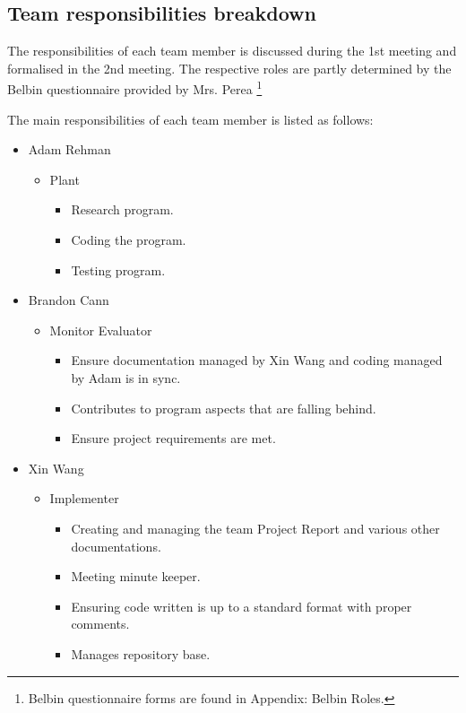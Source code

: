 \documentclass[12pt,a4paper]{article}
\begin{document}
	\subsection{Team responsibilities breakdown}
	The responsibilities of each team member is discussed during the 1st meeting and formalised in the 2nd meeting. The
	respective roles are partly determined by the Belbin questionnaire provided by Mrs. Perea 
	\footnote{Belbin questionnaire forms are found in Appendix: Belbin Roles.}
	\par
	The main responsibilities of each team member is listed as follows:
	\begin{itemize}
		\item Adam Rehman
		\begin{itemize}
			\item Plant
			\begin{itemize}
				\item Research program.
				\item Coding the program.
				\item Testing program.
			\end{itemize}
		\end{itemize}
		\item Brandon Cann
		\begin{itemize}
			\item Monitor Evaluator
			\begin{itemize}
				\item Ensure documentation managed by Xin Wang and coding managed by Adam is in sync.
				\item Contributes to program aspects that are falling behind.
				\item Ensure project requirements are met.
			\end{itemize}
		\end{itemize}
		\item Xin Wang
		\begin{itemize}
			\item Implementer
			\begin{itemize}
				\item Creating and managing the team Project Report and various other documentations.
				\item Meeting minute keeper.
				\item Ensuring code written is up to a standard format with proper comments.
				\item Manages repository base.
			\end{itemize}
		\end{itemize}
	\end{itemize}
\end{document}
